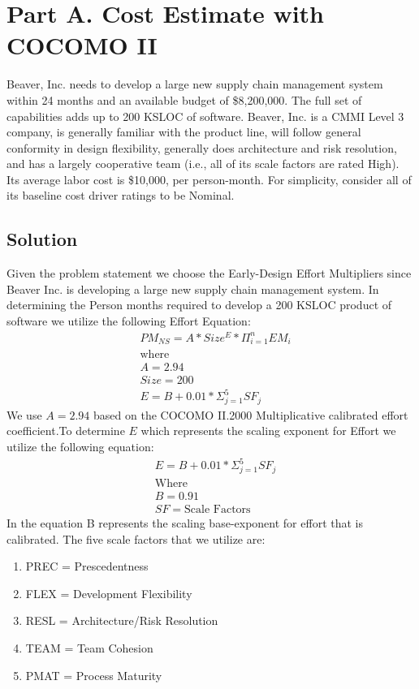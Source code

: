 \documentclass[12pt,letterpaper]{article}
\begin{document}
\section*{Part A. Cost Estimate with COCOMO II}
Beaver, Inc. needs to develop a large new supply chain management system within 24 months and an available budget of \$8,200,000.  The full set of capabilities adds up to 200 KSLOC of software.  Beaver, Inc. is a CMMI Level 3 company, is generally familiar with the product line, will follow general conformity in design flexibility, generally does architecture and risk resolution, and has a largely cooperative team (i.e., all of its scale factors are rated High).  Its average labor cost is \$10,000, per person-month.  For simplicity, consider all of its baseline cost driver ratings to be Nominal.
\subsection*{Solution}
Given the problem statement we choose the Early-Design Effort Multipliers since Beaver Inc. is developing a large new supply chain management system. In determining the Person months required to develop a 200 KSLOC product of software we utilize the following Effort Equation:
    \begin{align*}
        &PM_{NS} = A * Size^E * \Pi_{i=1}^{n}EM_i\\
        &\text{where}\\
        &A = 2.94\\
        &Size = 200\\
        &E = B + 0.01 * \Sigma_{j=1}^{5}SF_j
    \end{align*}
We use $A = 2.94$ based on the COCOMO II.2000 Multiplicative calibrated effort coefficient.To determine $E$ which represents the scaling exponent for Effort we utilize the following equation:
    \begin{align*}
        &E = B + 0.01 * \Sigma_{j=1}^{5}SF_j\\
        &\text{Where}\\
        &B = 0.91\\
        &SF = \text{Scale Factors}
    \end{align*}
In the equation B represents the scaling base-exponent for effort that is calibrated. The five scale factors that we utilize are:
    \begin{enumerate}
        \item PREC = Prescedentness
        \item FLEX = Development Flexibility
        \item RESL = Architecture/Risk Resolution
        \item TEAM = Team Cohesion
        \item PMAT = Process Maturity
    \end{enumerate}
\end{document}
